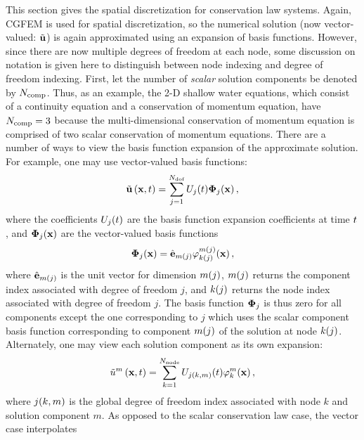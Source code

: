 This section gives the spatial discretization for conservation law systems.
Again, CGFEM is used for
spatial discretization, so the numerical solution (now vector-valued:
$\tilde{\mathbf{u}}$) is again approximated using an expansion of basis
functions. However, since there are now multiple degrees of freedom at each
node, some discussion on notation is given here to distinguish between node
indexing and degree of freedom indexing.  First, let the number of
\emph{scalar} solution components be denoted by $N_\text{comp}$.  Thus, as an
example, the 2-D shallow water equations, which consist of a continuity
equation and a conservation of momentum equation, have $N_\text{comp}=3$ because
the multi-dimensional conservation of momentum equation is comprised of two
scalar conservation of momentum equations.  There are a number of ways to view
the basis function expansion of the approximate solution. For example, one may
use vector-valued basis functions:
\begin{equation}
  \tilde{\mathbf{u}}\left(\mathbf{x},t\right) = \sum\limits_{j=1}^{N_\text{dof}}
    U_j(t)\mathbf{\Phi}_j(\mathbf{x}) \,,
\end{equation}
where the coefficients $U_j(t)$ are the basis function
expansion coefficients at time $t$, and $\mathbf{\Phi}_j(\mathbf{x})$
are the vector-valued basis functions
\begin{equation}
  \mathbf{\Phi}_j(\mathbf{x}) = 
    \hat{\mathbf{e}}_{m(j)}
      \varphi^{m(j)}_{k(j)}(\mathbf{x})
  \,,
\end{equation}
where $\hat{\mathbf{e}}_{m(j)}$ is the unit vector for dimension
$m(j)$, $m(j)$ returns the component index associated with degree
of freedom $j$, and $k(j)$ returns the node index associated with
degree of freedom $j$. The basis function $\mathbf{\Phi}_j$ is thus
zero for all components except the one corresponding to $j$ which uses
the scalar component basis function corresponding to component $m(j)$ of
the solution at node $k(j)$.
Alternately, one may view each solution component as its own expansion:
\begin{equation}
  \tilde{u}^m\left(\mathbf{x},t\right) = \sum\limits_{k=1}^{N_\text{node}}
    U_{j(k,m)}(t)\varphi^m_k(\mathbf{x})
  \,,
\end{equation}
where $j(k,m)$ is the global degree of freedom index associated
with node $k$ and solution component $m$.
As opposed to the scalar conservation law case, the vector case interpolates
